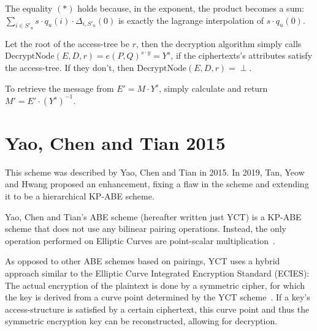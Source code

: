 The equality $(*)$ holds because, in the exponent, the product becomes a sum: $\sum_{i\in S'_u} s \cdot q_u(i) \cdot \Delta_{i,S'_u}(0)$ is exactly the lagrange interpolation of $s \cdot q_u(0)$.

Let the root of the \gls{access-tree} be $r$, then the decryption algorithm simply calls $\text{DecryptNode}(E, D, r) = e(P,Q)^{s \cdot y} = Y^s$, if the ciphertexts's attributes satisfy the \gls{access-tree}.
If they don't, then $\text{DecryptNode}(E, D, r) = \perp$.

To retrieve the message from $E' = M \cdot Y^s$, simply calculate and return $M' = E' \cdot (Y^s)^{-1}$.


\section{Yao, Chen and Tian 2015}\label{sec:yct}

This scheme was described by Yao, Chen and Tian \cite{yao_lightweight_2015} in 2015.
In 2019, Tan, Yeow and Hwang \cite{tan_enhancement_2019} proposed an enhancement, fixing a flaw in the scheme and extending it to be a hierarchical KP-ABE scheme.

Yao, Chen and Tian's ABE scheme (hereafter written just YCT) is a KP-ABE scheme that does not use any bilinear pairing operations.
Instead, the only operation performed on Elliptic Curves are point-scalar multiplication~\cite{yao_lightweight_2015}.

As opposed to other ABE schemes based on pairings, YCT uses a hybrid approach similar to the Elliptic Curve Integrated Encryption Standard (ECIES):
The actual encryption of the plaintext is done by a symmetric cipher, for which the key is derived from a curve point determined by the YCT scheme~\cite{yao_lightweight_2015}.
If a key's \gls{access-structure} is satisfied by a certain ciphertext, this curve point and thus the symmetric encryption key can be reconstructed, allowing for decryption.


